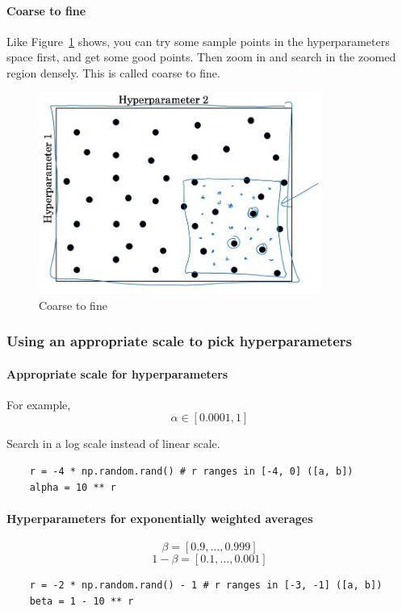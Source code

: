 \documentclass[UTF8]{article}
\begin{document}
\paragraph{Coarse to fine}
Like Figure~\ref{fig:coarse-to-fine} shows, you can try some sample points in the hyperparameters
space first, and get some good points. Then zoom in and search in the zoomed region densely. This
is called coarse to fine.

\begin{figure}[htb]
    \centering
    \includegraphics[width=25em]{figures/coarse-to-fine}
    \caption{Coarse to fine}
    \label{fig:coarse-to-fine}
\end{figure}

\subsubsection{Using an appropriate scale to pick hyperparameters}
\paragraph{Appropriate scale for hyperparameters}
For example,
$$\alpha \in [0.0001, 1]$$

Search in a log scale instead of linear scale.

\begin{verbatim}
    r = -4 * np.random.rand() # r ranges in [-4, 0] ([a, b])
    alpha = 10 ** r
\end{verbatim}

\paragraph{Hyperparameters for exponentially weighted averages}
$$ \beta = [0.9, \ldots, 0.999] $$
$$ 1 - \beta = [0.1, \ldots, 0.001] $$
\begin{verbatim}
    r = -2 * np.random.rand() - 1 # r ranges in [-3, -1] ([a, b])
    beta = 1 - 10 ** r
\end{verbatim}
\end{document}
